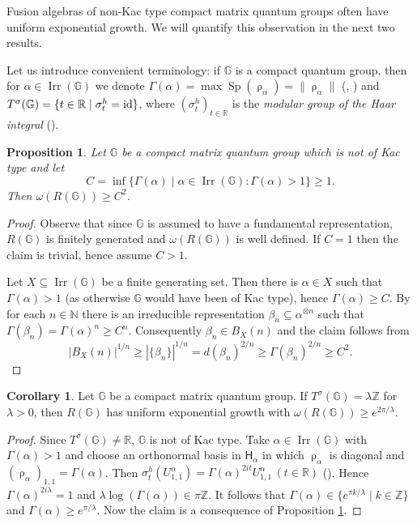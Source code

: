 \documentclass[11 pt, leqno]{amsart}
\newcommand{\id}{\textnormal{id}}
\newcommand{\msf}{\mathsf}
\newcommand{\NN}{\mathbb{N}}
\newcommand{\RR}{\mathbb{R}}
\newcommand{\ZZ}{\mathbb{Z}}
\newcommand{\GG}{\mathbb{G}}
\newcommand{\oon}{\operatorname}
\DeclareMathOperator{\Irr}{Irr}
\newtheorem{proposition}[theorem]{Proposition}
\theoremstyle{definition}
\newtheorem{corollary}[theorem]{Corollary}
\numberwithin{equation}{section}
\begin{document}
Fusion algebras of non-Kac type compact matrix quantum groups often have uniform exponential growth. We will quantify this observation in the next two results.

Let us introduce convenient terminology: if $\GG$ is a compact quantum group, then for $\alpha\in \Irr(\GG)$ we denote $\Gamma(\alpha)=\max \oon{Sp}(\uprho_\alpha)=\|\uprho_\alpha\|$ (\cite{KrajczokSoltanBounded}, \cite[Section 3.1]{KrajczokSoltan}) and $T^\sigma(\GG)=\{t\in \RR\mid \sigma^h_t=\id\}$, where $(\sigma^h_t)_{t\in\RR}$ is the \emph{modular group of the Haar integral} (\cite[Definition 2.1]{KrajczokSoltan}).

\begin{proposition}\label{prop9}
Let $\GG$ be a compact matrix quantum group which is not of Kac type and let
\[
C=\inf\{ \Gamma(\alpha)\mid \alpha\in \Irr(\GG)\colon \Gamma(\alpha)>1\} \ge 1.
\]
Then $\omega(R(\GG))\ge C^2$.
\end{proposition}

\begin{proof}
Observe that since $\GG$ is assumed to have a fundamental representation, $R(\GG)$ is finitely generated and $\omega(R(\GG))$ is well defined. If $C=1$ then the claim is trivial, hence assume $C>1$.

Let $X\subseteq \Irr(\GG)$ be a finite generating set. Then there is $\alpha\in X$ such that $\Gamma(\alpha)>1$ (as otherwise $\GG$ would have been of Kac type), hence $\Gamma(\alpha)\ge C$. By \cite[Proposition 6.1]{KrajczokSoltanBounded} for each $n\in\NN$ there is an irreducible representation $\beta_n\subseteq \alpha^{\otimes n}$ such that $\Gamma(\beta_n)=\Gamma(\alpha)^n\ge C^n$. Consequently $\beta_n\in B_X(n)$ and the claim follows from
\[
|B_X(n)|^{1/n} \ge |\{\beta_n\}|^{1/n}=
d(\beta_n)^{2/n}\ge 
\Gamma(\beta_n)^{2/n} \ge C^{2}.
\]
\end{proof}

\begin{corollary}\label{cor2}
Let $\GG$ be a compact matrix quantum group. If $T^\sigma(\GG)=\lambda \ZZ$ for $\lambda >0$, then $R(\GG)$ has uniform exponential growth with $\omega(R(\GG))\ge e^{2\pi / \lambda}$.
\end{corollary}

\begin{proof}
Since $T^\sigma(\GG)\neq \RR$, $\GG$ is not of Kac type. Take $\alpha\in \Irr(\GG)$ with $\Gamma(\alpha)>1$ and choose an orthonormal basis in $\msf{H}_\alpha$ in which $\uprho_\alpha$ is diagonal and $(\uprho_{\alpha})_{1,1}=\Gamma(\alpha)$. Then $\sigma^h_t(U^{\alpha}_{1,1})=\Gamma(\alpha)^{2it} U^{\alpha}_{1,1}\,(t\in\RR)$ (\cite[Section 1.7]{NeshveyevTuset}). Hence $\Gamma(\alpha)^{2i\lambda}=1$ and $\lambda\log(\Gamma(\alpha)) \in \pi \ZZ$. It follows that $\Gamma(\alpha) \in \{e^{ \pi k /\lambda}\mid k\in\ZZ\}$ and $\Gamma(\alpha) \ge e^{\pi/\lambda}$. Now the claim is a consequence of Proposition \ref{prop9}.
\end{proof}
\end{document}

